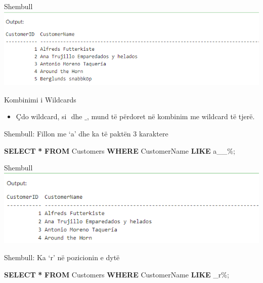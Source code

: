 \documentclass[
  ignorenonframetext,
]{beamer}
\newenvironment{Shaded}{\begin{snugshade}}{\end{snugshade}}
\newcommand{\KeywordTok}[1]{\textcolor[rgb]{0.13,0.29,0.53}{\textbf{#1}}}
\newcommand{\NormalTok}[1]{#1}
\newcommand{\OperatorTok}[1]{\textcolor[rgb]{0.81,0.36,0.00}{\textbf{#1}}}
\newcommand{\StringTok}[1]{\textcolor[rgb]{0.31,0.60,0.02}{#1}}
\providecommand{\tightlist}{%
  \setlength{\itemsep}{0pt}\setlength{\parskip}{0pt}}
\begin{document}
\begin{frame}{Shembull}
\label{shembull-17}
\includegraphics{./Figs/query72.png}
\end{frame}

\begin{frame}{Kombinimi i Wildcards}
\label{kombinimi-i-wildcards}
\begin{itemize}
\tightlist
\item
  Çdo wildcard, si \(%
  \) dhe \(\_\), mund të përdoret në kombinim me wildcard të tjerë.
\end{itemize}
\end{frame}

\begin{frame}[fragile]{Shembull: Fillon me `a' dhe ka të paktën 3
karaktere}
\label{shembull-fillon-me-a-dhe-ka-tuxeb-paktuxebn-3-karaktere-1}
\begin{Shaded}
\begin{Highlighting}[]
\KeywordTok{SELECT} \OperatorTok{*}
\KeywordTok{FROM}\NormalTok{ Customers}
\KeywordTok{WHERE}\NormalTok{ CustomerName }\KeywordTok{LIKE} \StringTok{\textquotesingle{}a\_\_\%\textquotesingle{}}\NormalTok{;}
\end{Highlighting}
\end{Shaded}
\end{frame}

\begin{frame}{Shembull}
\label{shembull-18}
\includegraphics{./Figs/query73.png}
\end{frame}

\begin{frame}[fragile]{Shembull: Ka `r' në pozicionin e dytë}
\label{shembull-ka-r-nuxeb-pozicionin-e-dytuxeb}
\begin{Shaded}
\begin{Highlighting}[]
\KeywordTok{SELECT} \OperatorTok{*}
\KeywordTok{FROM}\NormalTok{ Customers}
\KeywordTok{WHERE}\NormalTok{ CustomerName }\KeywordTok{LIKE} \StringTok{\textquotesingle{}\_r\%\textquotesingle{}}\NormalTok{;}
\end{Highlighting}
\end{Shaded}
\end{frame}
\end{document}
